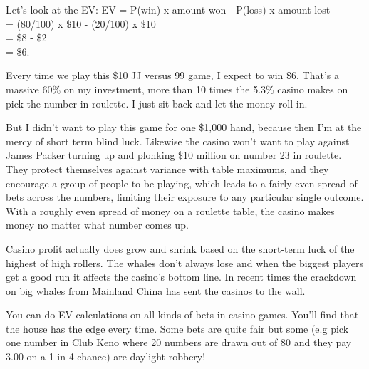 Let's look at the EV:
EV = P(win) x amount won - P(loss) x amount lost \\
   = (80/100) x \$10 - (20/100) x \$10 \\
   = \$8 - \$2 \\
   = \$6.

Every time we play this \$10 JJ versus 99 game, I expect to win \$6. That's a
massive 60\% on my investment, more than 10 times the 5.3\% casino makes on
pick the number in roulette. I just sit back and let the money roll in.

But I didn't want to play this game for one \$1,000 hand, because then
I'm at the mercy of short term blind luck. Likewise the casino won't
want to play against James Packer turning up and plonking \$10 million
on number 23 in roulette. They protect themselves against variance
with table maximums, and they encourage a group of people to be playing,
which leads to a fairly even spread of bets across the numbers, limiting
their exposure to any particular single outcome. With a roughly even spread
of money on a roulette table, the casino makes money no matter what
number comes up.

Casino profit actually does grow and shrink based on the short-term
luck of the highest of high rollers. The whales don't always lose and
when the biggest players get a good run it affects the casino's bottom
line. In recent times the crackdown on big whales from Mainland China
has sent the casinos to the wall.

You can do EV calculations on all kinds of bets in casino games.
You'll find that the house has the edge every time. Some bets
are quite fair but some (e.g pick one number in Club Keno
where 20 numbers are drawn out of 80 and they pay
3.00 on a 1 in 4 chance) are daylight robbery!



